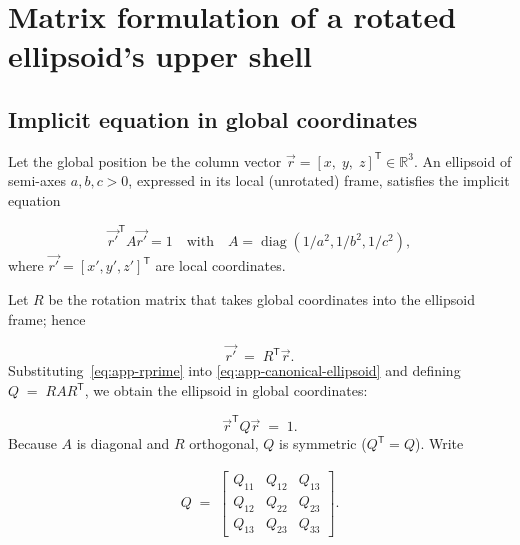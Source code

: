 \chapter{Matrix formulation of a rotated ellipsoid's upper shell}
\label{app:ellipsoid-matrix}


\section{Implicit equation in global coordinates}
Let the global position be the column vector $ \vec{r} = [ x,\;y,\;z ]^{\mathsf T}\in\mathbb R^{3}$. An ellipsoid of semi-axes $a,b,c>0$, expressed in its local (unrotated) frame, satisfies the implicit equation

\begin{equation}
    \label{eq:app-canonical-ellipsoid}
    \vec{r'}^{\mathsf T} A \vec{r'} = 1
    \quad\text{with}\quad 
    A = \operatorname{diag}\!\left(1/a^{2}, 1/b^{2}, 1/c^{2}\right),
\end{equation}
where $\vec{r'} = [x',y',z']^{\mathsf T}$ are local coordinates.

Let $R$ be the rotation matrix that takes global coordinates into the ellipsoid frame; hence

\begin{equation}
    \label{eq:app-rprime}
    \vec{r'} \;=\; R^{\mathsf T}  \vec{r}.
\end{equation}
Substituting~\ref{eq:app-rprime} into \ref{eq:app-canonical-ellipsoid} and defining $Q \;=\; R A R^{\mathsf T}$, we obtain the ellipsoid in global coordinates:

\begin{equation}
    \label{eq:app-global-implicit}
     \vec{r}^{\mathsf T} Q  \vec{r} \;=\; 1.
\end{equation}
Because $A$ is diagonal and $R$ orthogonal, $Q$ is symmetric ($Q^{\mathsf T}=Q$).  Write

\begin{align}
    Q \;=\;
    \begin{bmatrix}
    Q_{11} & Q_{12} & Q_{13}\\
    Q_{12} & Q_{22} & Q_{23}\\
    Q_{13} & Q_{23} & Q_{33}
    \end{bmatrix}.
\end{align}

